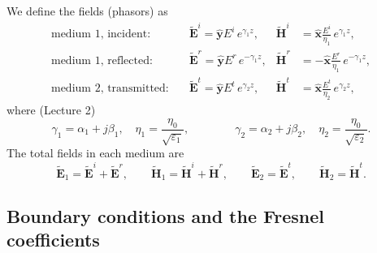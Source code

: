\documentclass[11pt, oneside]{article}
\begin{document}
We define the fields (phasors) as
\begin{align}
	\text{medium 1, incident:} \quad &
	\tilde{\mathbf{E}}^i = \hat{\mathbf{y}}E^i\,e^{\gamma_1 z}, &
	\tilde{\mathbf{H}}^i &= \hat{\mathbf{x}}\frac{E^i}{\eta_1}\,e^{\gamma_1 z}, \label{e:fields_i}\\
	\text{medium 1, reflected:} \quad &
	\tilde{\mathbf{E}}^r = \hat{\mathbf{y}}E^r\,e^{-\gamma_1 z}, &
	\tilde{\mathbf{H}}^r &= -\hat{\mathbf{x}}\frac{E^r}{\eta_1}\,e^{-\gamma_1 z}, \label{e:fields_r}\\
	\text{medium 2, transmitted:} \quad &
	\tilde{\mathbf{E}}^t = \hat{\mathbf{y}}E^t\,e^{\gamma_2 z}, &
	\tilde{\mathbf{H}}^t &= \hat{\mathbf{x}}\frac{E^t}{\eta_2}\,e^{\gamma_2 z}, \label{e:fields_t}
\end{align}
where (Lecture 2)
\begin{equation}
	\gamma_1 = \alpha_1 + j\beta_1, \quad \eta_1 = \frac{\eta_0}{\sqrt{\varepsilon_1}},
	\qquad\qquad
	\gamma_2 = \alpha_2 + j\beta_2, \quad \eta_2 = \frac{\eta_0}{\sqrt{\varepsilon_2}}.
\end{equation}
The total fields in each medium are
\begin{equation}
	\tilde{\mathbf{E}}_1 = \tilde{\mathbf{E}}^i + \tilde{\mathbf{E}}^r, \qquad
	\tilde{\mathbf{H}}_1 = \tilde{\mathbf{H}}^i + \tilde{\mathbf{H}}^r, \qquad
	\tilde{\mathbf{E}}_2 = \tilde{\mathbf{E}}^t, \qquad
	\tilde{\mathbf{H}}_2 = \tilde{\mathbf{H}}^t.
\end{equation}

\subsection{Boundary conditions and the Fresnel coefficients}
\end{document}
